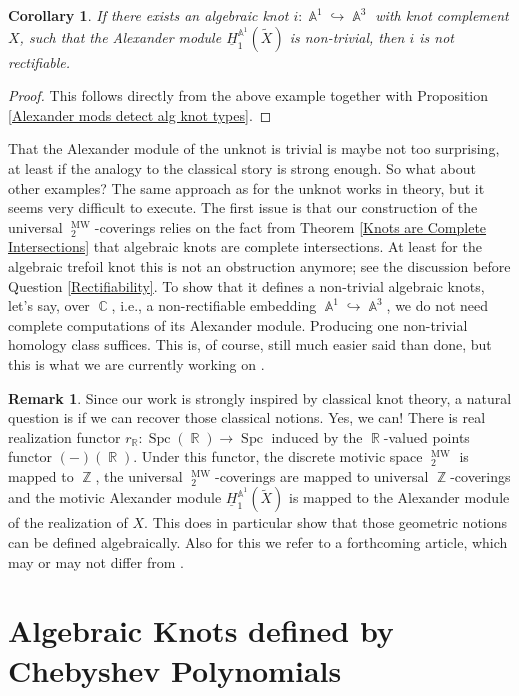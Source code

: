 \documentclass[english]{amsart}
\newtheorem{cor}[prop]{Corollary}
\theoremstyle{definition}
\newtheorem{rem}[prop]{Remark}
\DeclareMathOperator{\Z}{\mathbb{Z}}
\DeclareMathOperator{\R}{\mathbb{R}}
\DeclareMathOperator{\C}{\mathbb{C}}
\DeclareMathOperator{\A}{\mathbb{A}}
\DeclareMathOperator{\Spc}{Spc}
\DeclareMathOperator{\KK}{\underline{K}}
\DeclareMathOperator{\MW}{MW}
\begin{document}
\begin{cor}\label{Rectifiability invariant}
If there exists an algebraic knot $i \colon \A^1 \hookrightarrow \A^3$ with knot complement $X$, such that the Alexander module $\underline{H}_1^{\A^1}\!(\widetilde{X})$ is non-trivial, then $i$ is not rectifiable.
\end{cor}
\begin{proof}
This follows directly from the above example together with Proposition \ref{Alexander mods detect alg knot types}.
\end{proof}
That the Alexander module of the unknot is trivial is maybe not too surprising, at least if the analogy to the classical story is strong enough. So what about other examples? The same approach as for the unknot works in theory, but it seems very difficult to execute. The first issue is that our construction of the universal $\KK^{\MW}_2$-coverings relies on the fact from Theorem \ref{Knots are Complete Intersections} that algebraic knots are complete intersections. At least for the algebraic trefoil knot this is not an obstruction anymore; see the discussion before Question \ref{Rectifiability}. To show that it defines a non-trivial algebraic knots, let's say, over $\C$, i.e., a non-rectifiable embedding $\A^1 \hookrightarrow \A^3$, we do not need complete computations of its Alexander module. Producing one non-trivial homology class suffices. This is, of course, still much easier said than done, but this is what we are currently working on \cite{WW2}.
\begin{rem}
Since our work is strongly inspired by classical knot theory, a natural question is if we can recover those classical notions. Yes, we can! There is real realization functor $r_{\R} \colon \Spc(\R) \rightarrow \Spc$ induced by the $\R$-valued points functor $(-)(\R)$. Under this functor, the discrete motivic space $\KK^{\MW}_2$ is mapped to $\Z$, the universal $\KK^{\MW}_2$-coverings are mapped to universal $\Z$-coverings and the motivic Alexander module $\underline{H}_1^{\A^1}\!(\widetilde{X})$ is mapped to the Alexander module of the realization of $X$. This does in particular show that those geometric notions can be defined algebraically. Also for this we refer to a forthcoming article, which may or may not differ from \cite{WW2}.
\end{rem}

\appendix
\section{Algebraic Knots defined by Chebyshev Polynomials}\label{Appendix A}
\end{document}

